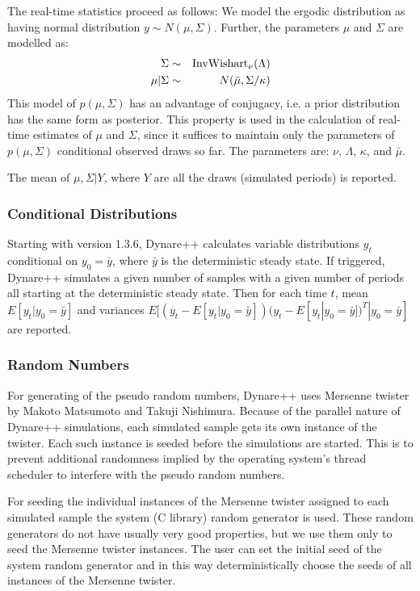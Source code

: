 \documentclass[10pt]{article}
\begin{document}
The real-time statistics proceed as follows: We model the ergodic
distribution as having normal distribution $y\sim N(\mu,\Sigma)$. Further,
the parameters $\mu$ and $\Sigma$ are modelled as:
\begin{eqnarray*}
  \Sigma &\sim& {\rm InvWishart}_\nu(\Lambda)\\
  \mu|\Sigma &\sim& N(\bar\mu,\Sigma/\kappa) \\ 
\end{eqnarray*}
This model of $p(\mu,\Sigma)$ has an advantage of conjugacy, i.e. a
prior distribution has the same form as posterior. This property is
used in the calculation of real-time estimates of $\mu$ and $\Sigma$,
since it suffices to maintain only the parameters of $p(\mu,\Sigma)$
conditional observed draws so far. The parameters are: $\nu$,
$\Lambda$, $\kappa$, and $\bar\mu$.

The mean of $\mu,\Sigma|Y$, where $Y$ are all the draws (simulated
periods) is reported.

\subsubsection{Conditional Distributions}
\label{cond_dist}

Starting with version 1.3.6, Dynare++ calculates variable
distributions $y_t$ conditional on $y_0=\bar y$, where $\bar y$ is the
deterministic steady state. If triggered, Dynare++ simulates a given
number of samples with a given number of periods all starting at
the deterministic steady state. Then for each time $t$, mean
$E[y_t|y_0=\bar y]$ and variances $E[(y_t-E[y_t|y_0=\bar
y])(y_t-E[y_t|y_0=\bar y])^T|y_0=\bar y]$ are reported.

\subsubsection{Random Numbers}
\label{random_numbers}

For generating of the pseudo random numbers, Dynare++ uses Mersenne
twister by Makoto Matsumoto and Takuji Nishimura. Because of the
parallel nature of Dynare++ simulations, each simulated sample gets
its own instance of the twister. Each such instance is seeded before
the simulations are started. This is to prevent additional randomness
implied by the operating system's thread scheduler to interfere with
the pseudo random numbers.

For seeding the individual instances of the Mersenne twister assigned
to each simulated sample the system (C library) random generator is
used. These random generators do not have usually very good
properties, but we use them only to seed the Mersenne twister
instances. The user can set the initial seed of the system random
generator and in this way deterministically choose the seeds of all
instances of the Mersenne twister.
\end{document}
